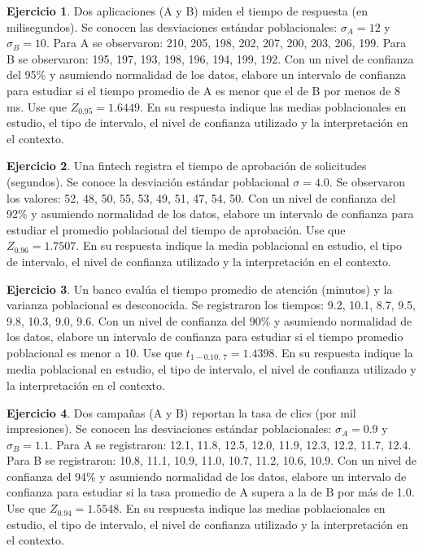 \documentclass[
  11pt,
]{book}
\theoremstyle{definition}
\theoremstyle{definition}
\theoremstyle{definition}
\newtheorem{exercise}{Ejercicio}[chapter]
\theoremstyle{definition}
\theoremstyle{remark}
\begin{document}
\begin{exercise}
Dos aplicaciones (A y B) miden el tiempo de respuesta (en milisegundos). Se conocen las desviaciones estándar poblacionales: \(\sigma_A = 12\) y \(\sigma_B = 10\). Para A se observaron: 210, 205, 198, 202, 207, 200, 203, 206, 199. Para B se observaron: 195, 197, 193, 198, 196, 194, 199, 192. Con un nivel de confianza del 95\% y asumiendo normalidad de los datos, elabore un intervalo de confianza para estudiar si el tiempo promedio de A es menor que el de B por menos de 8 ms. Use que \(Z_{0.95} = 1.6449\). En su respuesta indique las medias poblacionales en estudio, el tipo de intervalo, el nivel de confianza utilizado y la interpretación en el contexto.
\end{exercise}

\begin{exercise}
Una fintech registra el tiempo de aprobación de solicitudes (segundos). Se conoce la desviación estándar poblacional \(\sigma = 4.0\). Se observaron los valores: 52, 48, 50, 55, 53, 49, 51, 47, 54, 50. Con un nivel de confianza del 92\% y asumiendo normalidad de los datos, elabore un intervalo de confianza para estudiar el promedio poblacional del tiempo de aprobación. Use que \(Z_{0.96} = 1.7507\). En su respuesta indique la media poblacional en estudio, el tipo de intervalo, el nivel de confianza utilizado y la interpretación en el contexto.
\end{exercise}

\begin{exercise}
Un banco evalúa el tiempo promedio de atención (minutos) y la varianza poblacional es desconocida. Se registraron los tiempos: 9.2, 10.1, 8.7, 9.5, 9.8, 10.3, 9.0, 9.6. Con un nivel de confianza del 90\% y asumiendo normalidad de los datos, elabore un intervalo de confianza para estudiar si el tiempo promedio poblacional es menor a 10. Use que \(t_{1-0.10,\,7} = 1.4398\). En su respuesta indique la media poblacional en estudio, el tipo de intervalo, el nivel de confianza utilizado y la interpretación en el contexto.
\end{exercise}

\begin{exercise}
Dos campañas (A y B) reportan la tasa de clics (por mil impresiones). Se conocen las desviaciones estándar poblacionales: \(\sigma_A = 0.9\) y \(\sigma_B = 1.1\). Para A se registraron: 12.1, 11.8, 12.5, 12.0, 11.9, 12.3, 12.2, 11.7, 12.4. Para B se registraron: 10.8, 11.1, 10.9, 11.0, 10.7, 11.2, 10.6, 10.9. Con un nivel de confianza del 94\% y asumiendo normalidad de los datos, elabore un intervalo de confianza para estudiar si la tasa promedio de A supera a la de B por más de 1.0. Use que \(Z_{0.94} = 1.5548\). En su respuesta indique las medias poblacionales en estudio, el tipo de intervalo, el nivel de confianza utilizado y la interpretación en el contexto.
\end{exercise}
\end{document}
